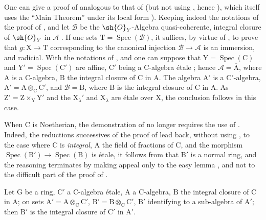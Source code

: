 \begin{remark}[18.12.14]
\label{IV.18.12.14}
One can give a proof of  analogous to that of  (but not using , hence ), which itself uses the ``Main Theorem'' under its local form ).
Keeping indeed the notations of the proof of , and let $\mathscr{B}$ be the $\sh{O}_Y$-Algebra quasi-coherente, integral closure of $\sh{O}_Y$ in $\mathscr{A}$ .
If one sets $\mathrm{T}=\operatorname{Spec}(\mathscr{B})$, it suffices, by virtue of , to prove that $g:\mathrm{X}\to\mathrm{T}$ corresponding to the canonical injection $\mathscr{B}\to\mathscr{A}$ is an immersion, and radicial.
With the notations of , and one can suppose that $\mathrm{Y}=\operatorname{Spec}(\mathrm{C})$ and $\mathrm{Y}'=\operatorname{Spec}(\mathrm{C}')$ are affine, $\mathrm{C}'$ being a $\mathrm{C}$-algebra \'etale ; hence $\mathscr{A}=\overline{\mathrm{A}}$, where $\mathrm{A}$ is a $\mathrm{C}$-algebra, $\mathrm{B}$ the integral closure of $\mathrm{C}$ in $\mathrm{A}$.
The algebra $\mathrm{A}'$ is a $\mathrm{C}'$-algebra, $\mathrm{A}'=\mathrm{A}\otimes_\mathrm{C}\mathrm{C}'$, and $\mathscr{B}=\overline{\mathrm{B}}$, where $\mathrm{B}$ is the integral closure of $\mathrm{C}$ in $\mathrm{A}$.
As $\mathrm{Z}'=\mathrm{Z}\times_\mathrm{Y}\mathrm{Y}'$ and the $\mathrm{X}_\lambda'$ and $\mathrm{X}_\lambda$ are \'etale over $\mathrm{X}$, the conclusion follows in this case.

When $\mathrm{C}$ is Noetherian, the demonstration of  no longer requires the use of .
Indeed, the reductions successives of the proof of  lead back, without using , to the case where $\mathrm{C}$ is \emph{integral}, $\mathrm{A}$ the field of fractions of $\mathrm{C}$, and the morphism $\operatorname{Spec}(\mathrm{B}')\to\operatorname{Spec}(\mathrm{B})$ is \'etale, it follows from  that $\mathrm{B}'$ is a normal ring, and the reasoning terminates by making appeal only to the easy lemma , and not to the difficult part of the proof of .
\end{remark}

\begin{proposition}[18.12.15]
\label{IV.18.12.15}
Let $\mathrm{G}$ be a ring, $\mathrm{C}'$ a $\mathrm{C}$-algebra \'etale, $\mathrm{A}$ a $\mathrm{C}$-algebra, $\mathrm{B}$ the integral closure of $\mathrm{C}$ in $\mathrm{A}$; on sets $\mathrm{A}'=\mathrm{A}\otimes_\mathrm{C}\mathrm{C}'$, $\mathrm{B}'=\mathrm{B}\otimes_\mathrm{C}\mathrm{C}'$, $\mathrm{B}'$ identifying to a sub-algebra of $\mathrm{A}'$; then $\mathrm{B}'$ is the integral closure of $\mathrm{C}'$ in $\mathrm{A}'$.
\end{proposition}

